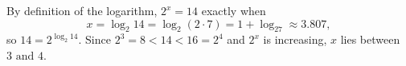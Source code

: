 By definition of the logarithm, $2^x=14$ exactly when
\[
x=\boxed{\log_2 14}=\log_2(2\cdot7)=1+\log_27\approx3.807 ,
\]
so $14=2^{\log_2 14}$. Since $2^3=8<14<16=2^4$ and $2^x$ is increasing, $x$ lies between $\boxed{3\text{ and }4}$.
